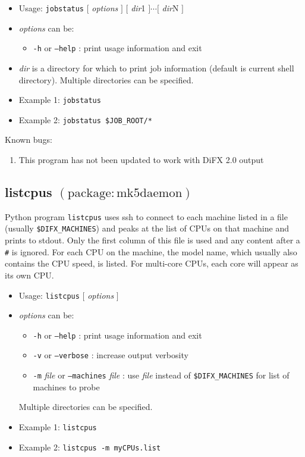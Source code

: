 \begin{itemize}
\item[] Usage: {\tt jobstatus} $[$ {\em options} $]$ $[$ {\em dir}1 $] \cdots [$ {\em dir}N $]$
\item[] {\em options} can be:
\begin{itemize}
\item[] {\tt -h} or {\tt --help} : print usage information and exit
\end{itemize}
\item[] {\em dir} is a directory for which to print job information (default is current shell directory).
Multiple directories can be specified.
\item[] Example 1: {\tt jobstatus}
\item[] Example 2: {\tt jobstatus \$JOB\_ROOT/*}
\end{itemize}


\noindent
Known bugs:
\begin{enumerate}
\item This program has not been updated to work with DiFX 2.0 output
\end{enumerate}







\subsection{listcpus {\small $\mathrm{(package: mk5daemon)}$}} \label{sec:listcpus}

Python program {\tt listcpus} uses ssh to connect to each machine listed in a file (usually {\tt \$DIFX\_MACHINES}) and peaks at the list of CPUs on that machine and prints to stdout.
Only the first column of this file is used and any content after a {\tt \#} is ignored.
For each CPU on the machine, the model name, which usually also contains the CPU speed, is listed.
For multi-core CPUs, each core will appear as its own CPU.

\begin{itemize}
\item[] Usage: {\tt listcpus} $[$ {\em options} $]$
\item[] {\em options} can be:
\begin{itemize}
\item[] {\tt -h} or {\tt --help} : print usage information and exit
\item[] {\tt -v} or {\tt --verbose} : increase output verbosity
\item[] {\tt -m} {\em file} or {\tt --machines} {\em file} : use {\em file} instead of {\tt \$DIFX\_MACHINES} for list of machines to probe
\end{itemize}
Multiple directories can be specified.
\item[] Example 1: {\tt listcpus}
\item[] Example 2: {\tt listcpus -m myCPUs.list}
\end{itemize}








